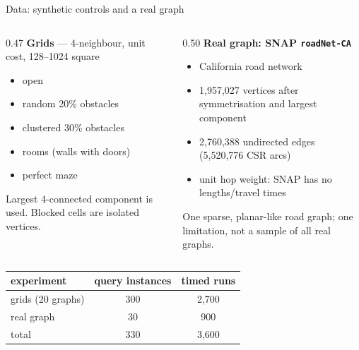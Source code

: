 \documentclass[aspectratio=169,10pt]{beamer}
\begin{document}
\begin{frame}{Data: synthetic controls and a real graph}
  \begin{columns}[T,onlytextwidth]
    \begin{column}{0.47\textwidth}
      \textbf{Grids} --- 4-neighbour, unit cost, 128--1024 square
      \begin{itemize}
        \item open
        \item random 20\% obstacles
        \item clustered 30\% obstacles
        \item rooms (walls with doors)
        \item perfect maze
      \end{itemize}
      \small Largest 4-connected component is used. Blocked cells are isolated
      vertices.
    \end{column}
    \begin{column}{0.50\textwidth}
      \textbf{Real graph: SNAP \texttt{roadNet-CA}}
      \begin{itemize}
        \item California road network
        \item 1,957,027 vertices after symmetrisation and largest component
        \item 2,760,388 undirected edges (5,520,776 CSR arcs)
        \item unit hop weight: SNAP has no lengths/travel times
      \end{itemize}
      \vspace{0.3em}
      \small One sparse, planar-like road graph; one limitation, not a sample
      of all real graphs.
    \end{column}
  \end{columns}
  \vspace{0.7em}
  \centering
  \begin{tabular}{lcc}
    \toprule
    experiment & query instances & timed runs\\
    \midrule
    grids (20 graphs) & 300 & 2,700\\
    real graph & 30 & 900\\
    \midrule
    total & 330 & 3,600\\
    \bottomrule
  \end{tabular}
\end{frame}
\end{document}
